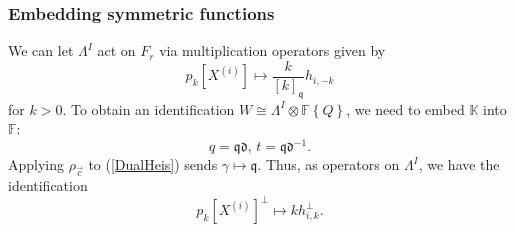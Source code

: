 \documentclass{amsart}
\newcommand{\K}{\mathbb{K}}
\newcommand{\F}{\mathbb{F}}
\newcommand{\qqq}{\mathfrak{q}}
\newcommand{\ddd}{\mathfrak{d}}
\theoremstyle{remark}
\numberwithin{thm}{section}
\numberwithin{equation}{section}
\begin{document}
\subsubsection{Embedding symmetric functions}
We can let $\Lambda^{I}$ act on $F_r$ via multiplication operators given by 
\begin{equation}
p_k[X^{(i)}]\mapsto \frac{k}{[k]_{\qqq}}h_{i,-k}
\label{PowerToBosons}
\end{equation}
for $k>0$.
To obtain an identification $W\cong \Lambda^{I}\otimes\F\left\{ Q \right\}$, we need to embed $\K$ into $\F$:
\begin{equation}
q=\qqq\ddd,\, t=\qqq\ddd^{-1}.
\label{qdtosu}
\end{equation}
Applying $\rho_{\vec{c}}$ to (\ref{DualHeis}) sends $\gamma\mapsto\qqq$.
Thus, as operators on $\Lambda^{I}$, we have the identification
\[
p_k[X^{(i)}]^\perp\mapsto kh_{i,k}^\perp.
\]
\end{document}
